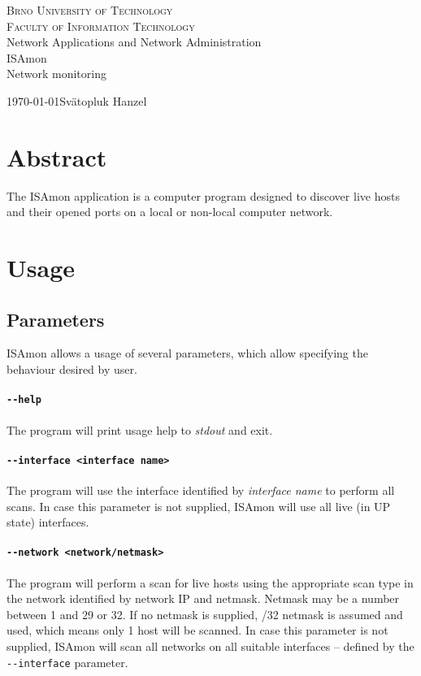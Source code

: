 \documentclass[11pt,a4paper]{article}
\begin{document}
\begin{titlepage}
	\begin{center}
	    {\LARGE\textsc{Brno University of Technology}}\\
	    \smallskip
	    {\Large\textsc{Faculty of Information Technology}}\\
	    \bigskip
	    \LARGE{Network Applications and Network Administration}\\
	    \smallskip
		\Huge{ISAmon}\\
		\huge{Network monitoring}
	\end{center}
    {\today \hfill Svätopluk Hanzel}
\end{titlepage}

\tableofcontents

\newpage
\section*{Abstract}
	The ISAmon application is a computer program designed to discover live hosts and their opened ports on a local or non-local computer network.
\newpage

\section{Usage}
	\subsection{Parameters}
		ISAmon allows a usage of several parameters, which allow specifying the behaviour desired by user.
		\paragraph{\texttt{-{}-help}} The program will print usage help to \emph{stdout} and exit.
		\vspace{-0.5cm}
		\paragraph{\texttt{-{}-interface <interface name>}} The program will use the interface identified by \emph{interface name} to perform all scans. In case this parameter is not supplied, ISAmon will use all live (in UP state) interfaces.
		\vspace{-0.5cm}
		\paragraph{\texttt{-{}-network <network/netmask>}} The program will perform a scan for live hosts using the appropriate scan type in the network identified by network IP and netmask. Netmask may be a number between 1 and 29 or 32. If no netmask is supplied, /32 netmask is assumed and used, which means only 1 host will be scanned. In case this parameter is not supplied, ISAmon will scan all networks on all suitable interfaces -- defined by the \texttt{-{}-interface} parameter.
		\vspace{-0.5cm}
\end{document}
